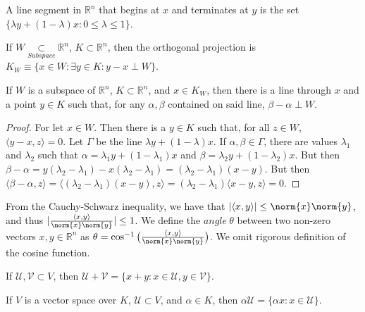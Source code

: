             \begin{definition}
            A line segment in $\mathbb{R}^n$ that begins at $x$ and terminates at $y$ is the set $\{\lambda y + (1-\lambda)x: 0\leq \lambda \leq 1 \}$.
            \end{definition}
            \begin{definition}
            If $W\underset{Subspace}\subset\mathbb{R}^n$, $K \subset \mathbb{R}^n$, then the orthogonal projection is $K_{W}\equiv\{x\in W: \exists y\in K: y-x \perp W\}$.
            \end{definition}
            \begin{theorem}
            If $W$ is a subspace of $\mathbb{R}^n$, $K \subset \mathbb{R}^n$, and $x\in K_{W}$, then there is a line through $x$ and a point $y\in K$ such that, for any $\alpha, \beta$ contained on said line, $\beta-\alpha \perp W$.
            \end{theorem}
            \begin{proof}
            For let $x\in W$. Then there is a $y\in K$ such that, for all $z\in W$, $\langle y-x,z\rangle = 0$. Let $\Gamma$ be the line $\lambda y + (1-\lambda)x$. If $\alpha,\beta \in \Gamma$, there are values $\lambda_1$ and $\lambda_2$ such that $\alpha = \lambda_1 y+ (1-\lambda_1)x$ and $\beta = \lambda_2 y +(1-\lambda_2)x$. But then $\beta-\alpha = y(\lambda_2-\lambda_1)-x(\lambda_2-\lambda_1) = (\lambda_2-\lambda_1)(x-y)$. But then $\langle \beta - \alpha,z\rangle = \langle (\lambda_2-\lambda_1)(x-y),z\rangle = (\lambda_2-\lambda_1)\langle x-y,z \rangle = 0$.
            \end{proof}
            From the Cauchy-Schwarz inequality, we have that
            $|\langle x,y \rangle| \leq \norm{x}\norm{y}$, and thus
            $|\frac{\langle x,y \rangle}{\norm{x}\norm{y}}| \leq 1$. We
            define the $angle\ \theta$ between two non-zero vectors
            $x,y\in \mathbb{R}^n$ as $\theta=\cos^{-1}\big(\frac{\langle x,y \rangle}{\norm{x}\norm{y}}\big)$. We omit rigorous definition of
            the cosine function.
            \begin{definition}
            If $\mathcal{U},\mathcal{V}\subset V$, then $\mathcal{U}+\mathcal{V} = \{x+y:x\in \mathcal{U},y\in \mathcal{V}\}$.
            \end{definition}
            \begin{definition}
            If $V$ is a vector space over $K$, $\mathcal{U}\subset V$, and $\alpha \in K$, then $\alpha \mathcal{U} = \{\alpha x:x\in \mathcal{U}\}$.
            \end{definition}
